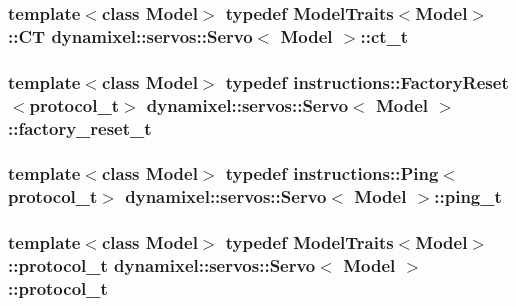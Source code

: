 \subsubsection[{ct\+\_\+t}]{\setlength{\rightskip}{0pt plus 5cm}template$<$class Model$>$ typedef {\bf Model\+Traits}$<$Model$>$\+::C\+T {\bf dynamixel\+::servos\+::\+Servo}$<$ Model $>$\+::{\bf ct\+\_\+t}}\label{classdynamixel_1_1servos_1_1_servo_a882738edc68b4e641e066954f59896d3}
\hypertarget{classdynamixel_1_1servos_1_1_servo_abbf04a51c076bfbf234179bb59fd45a2}{}
\subsubsection[{factory\+\_\+reset\+\_\+t}]{\setlength{\rightskip}{0pt plus 5cm}template$<$class Model$>$ typedef {\bf instructions\+::\+Factory\+Reset}$<${\bf protocol\+\_\+t}$>$ {\bf dynamixel\+::servos\+::\+Servo}$<$ Model $>$\+::{\bf factory\+\_\+reset\+\_\+t}}\label{classdynamixel_1_1servos_1_1_servo_abbf04a51c076bfbf234179bb59fd45a2}
\hypertarget{classdynamixel_1_1servos_1_1_servo_ae6ffa69927b65a1b73a52e80bcd07859}{}
\subsubsection[{ping\+\_\+t}]{\setlength{\rightskip}{0pt plus 5cm}template$<$class Model$>$ typedef {\bf instructions\+::\+Ping}$<${\bf protocol\+\_\+t}$>$ {\bf dynamixel\+::servos\+::\+Servo}$<$ Model $>$\+::{\bf ping\+\_\+t}}\label{classdynamixel_1_1servos_1_1_servo_ae6ffa69927b65a1b73a52e80bcd07859}
\hypertarget{classdynamixel_1_1servos_1_1_servo_a7718c41cee1187b992836f4b6bad8a38}{}
\subsubsection[{protocol\+\_\+t}]{\setlength{\rightskip}{0pt plus 5cm}template$<$class Model$>$ typedef {\bf Model\+Traits}$<$Model$>$\+::{\bf protocol\+\_\+t} {\bf dynamixel\+::servos\+::\+Servo}$<$ Model $>$\+::{\bf protocol\+\_\+t}}\label{classdynamixel_1_1servos_1_1_servo_a7718c41cee1187b992836f4b6bad8a38}
\hypertarget{classdynamixel_1_1servos_1_1_servo_a456a730b825adc0b7b295f567cf2947b}{}
